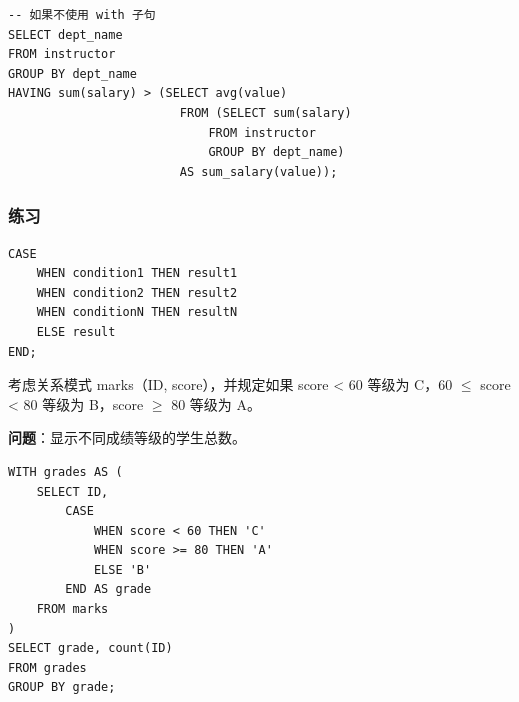 \documentclass[aspectratio=169, 14pt]{beamer}
\begin{document}
\begin{frame}[fragile]
	\begin{verbatim}
-- 如果不使用 with 子句
SELECT dept_name
FROM instructor
GROUP BY dept_name
HAVING sum(salary) > (SELECT avg(value)
                        FROM (SELECT sum(salary)
                            FROM instructor
                            GROUP BY dept_name)
                        AS sum_salary(value));
                        \end{verbatim}
\end{frame}

\begin{frame}[fragile]
	\frametitle{练习 {\large {}} }
	\begin{verbatim}
CASE
    WHEN condition1 THEN result1
    WHEN condition2 THEN result2
    WHEN conditionN THEN resultN
    ELSE result
END;
    \end{verbatim}

	考虑关系模式 marks（ID, score），并规定如果 score < 60 等级为 C，60 $\leq$ score < 80 等级为 B，score $\geq$ 80 等级为 A。

	\textbf{问题}：显示不同成绩等级的学生总数。

\end{frame}

\begin{frame}[fragile]

	\begin{verbatim}
WITH grades AS (
    SELECT ID,
        CASE
            WHEN score < 60 THEN 'C'
            WHEN score >= 80 THEN 'A'
            ELSE 'B'
        END AS grade
    FROM marks
)
SELECT grade, count(ID)
FROM grades
GROUP BY grade;
    \end{verbatim}

\end{frame}
\end{document}
